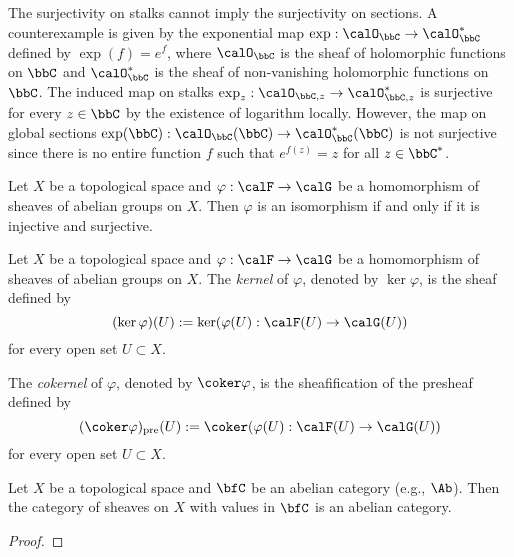     \begin{remark}\label{prop:surjective_on_stalk_cannot_imply_on_sections}
        The surjectivity on stalks cannot imply the surjectivity on sections.
        A counterexample is given by the exponential map \(\exp : \calO_\bbC \to \calO_\bbC^*\) defined by \(\exp(f) = e^{f}\), 
        where \(\calO_\bbC\) is the sheaf of holomorphic functions on \(\bbC\) and \(\calO_\bbC^*\) is the sheaf of non-vanishing holomorphic functions on \(\bbC\).
        The induced map on stalks \(\exp_z : \calO_{\bbC,z} \to \calO_{\bbC,z}^*\) is surjective for every \(z \in \bbC\) by the existence of logarithm locally.
        However, the map on global sections \(\exp(\bbC) : \calO_\bbC(\bbC) \to \calO_\bbC^*(\bbC)\) is not surjective since there is no entire function \(f\) such that \(e^{f(z)} = z\) for all \(z \in \bbC^*\).
    \end{remark}

    \begin{proposition}\label{prop:isomorphism_of_homomorphism_of_sheaves}
        Let \(X\) be a topological space and \(\varphi : \calF \to \calG\) be a homomorphism of sheaves of abelian groups on \(X\).
        Then \(\varphi\) is an isomorphism if and only if it is injective and surjective.
    \end{proposition}


    \begin{definition}\label{def:ker_and_cokernel_of_homomorphisms_of_sheaves}
        Let \(X\) be a topological space and \(\varphi : \calF \to \calG\) be a homomorphism of sheaves of abelian groups on \(X\).
        The \emph{kernel} of \(\varphi\), denoted by \(\ker \varphi\), is the sheaf defined by 
        \[
            (\ker \varphi)(U) := \ker(\varphi(U) : \calF(U) \to \calG(U))
        \]
        for every open set \(U \subset X\).

        The \emph{cokernel} of \(\varphi\), denoted by \(\coker \varphi\), is the sheafification of the presheaf defined by 
        \[
            (\coker \varphi)_{\text{pre}}(U) := \coker(\varphi(U) : \calF(U) \to \calG(U))
        \]
        for every open set \(U \subset X\).
    \end{definition}

    \begin{theorem}\label{thm:sheaves_on_topological_space_is_an_abelian_category}
        Let \(X\) be a topological space and \(\bfC\) be an abelian category (e.g., \(\Ab\)).
        Then the category of sheaves on \(X\) with values in \(\bfC\) is an abelian category.
    \end{theorem}
    \begin{proof}
    \end{proof}



